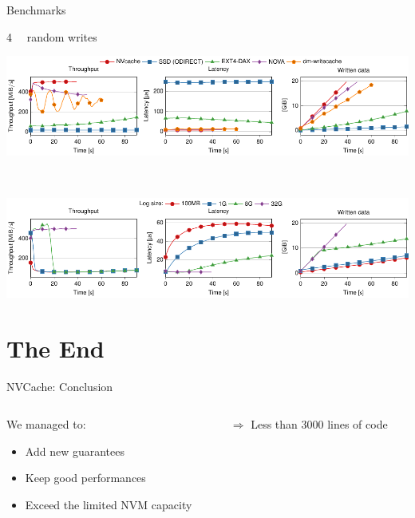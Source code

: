 \documentclass[presentation]{beamer}
\begin{document}
\begin{frame}[label={sec:orgfe7392d}]{Benchmarks}
\begin{block}{\SI{4}{\kibi\byte} random writes}
\begin{center}
\includegraphics[width=.9\linewidth]{./IMGs/paper-figure1.pdf}
\end{center} \pause\\

\begin{center}
\includegraphics[width=.9\linewidth]{./IMGs/paper-figure2.pdf}
\end{center}
\end{block}
\end{frame}


\section{The End}
\label{sec:org6e5c8fa}

\begin{frame}[label={sec:orgb9f9629}]{NVCache: Conclusion}
\begin{columns}
\begin{column}{0.6\columnwidth}
\begin{block}{We managed to:}
\begin{itemize}
\item Add new guarantees\\
\item Keep good performances\\
\item Exceed the limited NVM capacity\\
\end{itemize}
\end{block}
\end{column}

\begin{column}{0.4\columnwidth}
\begin{block}{\(\Rightarrow\) Less than 3000 lines of code}
\end{block}
\end{column}
\end{columns}
\end{frame}
\end{document}
